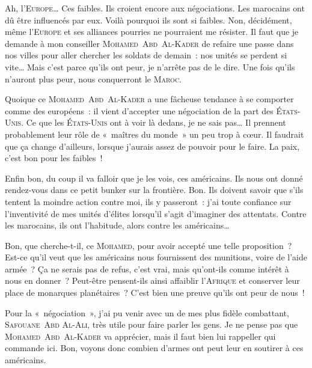 {	Ah, l’\textsc{Europe}…  Ces faibles.  Ils croient encore aux négociations.
	Les marocains ont dû être influencés par eux.  Voilà pourquoi ils sont si faibles.
	Non, décidément, même l’\textsc{Europe} et ses alliances pourries ne pourraient me résister.
	Il faut que je demande à mon conseiller \textsc{Mohamed~Abd~Al-Kader} de refaire une passe dans nos villes pour aller chercher les soldats de demain~:  nos unités se perdent si vite…
	Mais c’est parce qu’ils ont peur, je n’arrête pas de le dire.  Une fois qu’ils n’auront plus peur, nous conquerront le \textsc{Maroc}.

	Quoique ce \textsc{Mohamed~Abd~Al-Kader} a une fâcheuse tendance à se comporter comme des européens~:  il vient d’accepter une négociation de la part des \textsc{États-Unis}.
	Ce que les \textsc{États-Unis} ont à voir là dedans, je ne sais pas…  Il prennent probablement leur rôle de «~maîtres du monde~» un peu trop à cœur.
	Il faudrait que ça change d’ailleurs, lorsque j’aurais assez de pouvoir pour le faire.
	La paix, c’est bon pour les faibles~!

	Enfin bon, du coup il va falloir que je les vois, ces américains.
	Ils nous ont donné rendez-vous dans ce petit bunker sur la frontière.  Bon.
	Ils doivent savoir que s’ils tentent la moindre action contre moi, ils y passeront~:  j’ai toute confiance sur l’inventivité de mes unités d’élites lorsqu’il s’agit d’imaginer des attentats.
	Contre les marocains, ils ont l’habitude, alors contre les américains…

	Bon, que cherche-t-il, ce \textsc{Mohamed}, pour avoir accepté une telle proposition~?
	Est-ce qu’il veut que les américains nous fournissent des munitions, voire de l’aide armée~?
	Ça ne serais pas de refus, c’est vrai, mais qu’ont-ils comme intérêt à nous en donner~?
	Peut-être pensent-ils ainsi affaiblir l’\textsc{Afrique} et conserver leur place de monarques planétaires~?
	C’est bien une preuve qu’ils ont peur de nous~!

	Pour la «~négociation~», j’ai pu venir avec un de mes plus fidèle combattant, \textsc{Safouane~Abd Al-Ali}, très utile pour faire parler les gens.
	Je ne pense pas que \textsc{Mohamed~Abd~Al-Kader} va apprécier, mais il faut bien lui rappeller qui commande ici.
	Bon, voyons donc combien d’armes ont peut leur en soutirer à ces américains.
}

